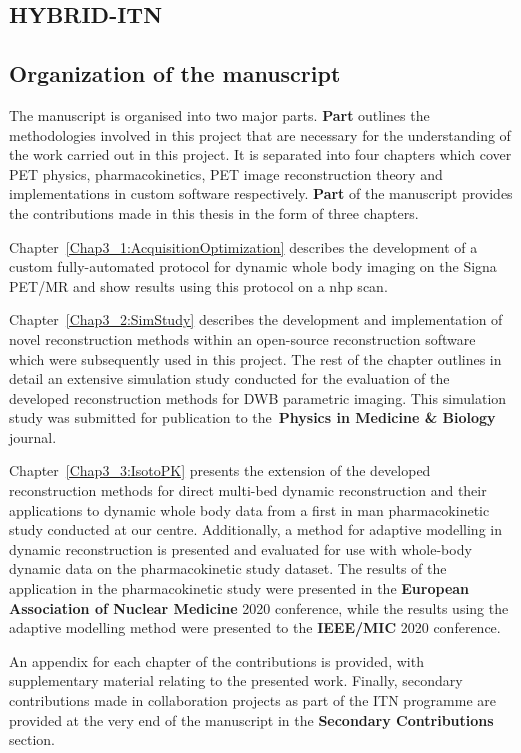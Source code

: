 \subsection*{HYBRID-ITN}


\subsection*{Organization of the manuscript}
The manuscript is organised into two major parts. \textbf{Part } outlines the methodologies involved in this project that are necessary for the understanding of the work carried out in this project. It is separated into four chapters which cover PET physics, pharmacokinetics, PET image reconstruction theory and implementations in custom software respectively. \textbf{Part } of the manuscript provides the contributions made in this thesis in the form of three chapters.

Chapter~\ref{Chap3_1:AcquisitionOptimization} describes the development of a custom fully-automated protocol for dynamic whole body imaging on the Signa PET/MR and show results using this protocol on a \gls{nhp} scan.

Chapter~\ref{Chap3_2:SimStudy} describes the development and implementation of novel reconstruction methods within an open-source reconstruction software which were subsequently used in this project. The rest of the chapter outlines in detail an extensive simulation study conducted for the evaluation of the developed reconstruction methods for DWB parametric imaging. This simulation study was submitted for publication to the~\textbf{Physics in Medicine \& Biology} journal. 

Chapter~\ref{Chap3_3:IsotoPK} presents the extension of the developed reconstruction methods for direct multi-bed dynamic reconstruction and their applications to dynamic whole body data from a first in man pharmacokinetic study conducted at our centre. Additionally, a method for adaptive modelling in dynamic reconstruction is presented and evaluated for use with whole-body dynamic data on the pharmacokinetic study dataset. The results of the application in the pharmacokinetic study were presented in the \textbf{European Association of Nuclear Medicine} 2020 conference, while the results using the adaptive modelling method were presented to the \textbf{IEEE/MIC} 2020 conference.

An appendix for each chapter of the contributions is provided, with supplementary material relating to the presented work. Finally, secondary contributions made in collaboration projects as part of the ITN programme are provided at the very end of the manuscript in the \textbf{Secondary Contributions} section.